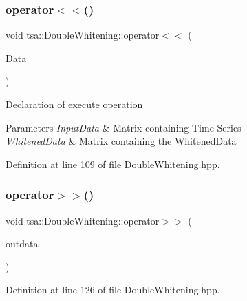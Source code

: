 \subsubsection{\texorpdfstring{operator$<$$<$()}{operator<<()}}
{\footnotesize\ttfamily void tsa\+::\+Double\+Whitening\+::operator$<$$<$ (\begin{DoxyParamCaption}\item[{\hyperlink{namespacetsa_ac599574bcc094eda25613724b8f3ca9e}{Seq\+View\+Double} \&}]{Data }\end{DoxyParamCaption})\hspace{0.3cm}{\ttfamily [inline]}}

Declaration of execute operation


\begin{DoxyParams}{Parameters}
{\em Input\+Data} & Matrix containing Time Series \\
\hline
{\em Whitened\+Data} & Matrix containing the Whitened\+Data \\
\hline
\end{DoxyParams}


Definition at line 109 of file Double\+Whitening.\+hpp.

\mbox{\label{classtsa_1_1_double_whitening_a0dffc968e6aab0ee59cd5aa521913fce}} 
\subsubsection{\texorpdfstring{operator$>$$>$()}{operator>>()}}
{\footnotesize\ttfamily void tsa\+::\+Double\+Whitening\+::operator$>$$>$ (\begin{DoxyParamCaption}\item[{\hyperlink{namespacetsa_ac599574bcc094eda25613724b8f3ca9e}{Seq\+View\+Double} \&}]{outdata }\end{DoxyParamCaption})\hspace{0.3cm}{\ttfamily [inline]}}



Definition at line 126 of file Double\+Whitening.\+hpp.

\mbox{\label{classtsa_1_1_double_whitening_a7ad38eb80858187dd73cf9c86e5e9d9b}} 
